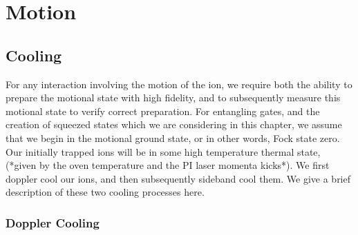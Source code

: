 \section{Motion}
\label{sec:Motion}

\subsection{Cooling}
\label{sec:Cooling}

    For any interaction involving the motion of the ion, we require both the
    ability to prepare the motional state with high fidelity, and to
    subsequently measure this motional state to verify correct preparation. For
    entangling gates, and the creation of squeezed states which we are
    considering in this chapter, we assume that we begin in the motional ground
    state, or in other words, Fock state zero.  Our initially trapped ions will
    be in some high temperature thermal state, (*given by the oven temperature
    and the PI laser momenta kicks*). We first doppler cool our ions, and then
    subsequently sideband cool them. We give a brief description of these two
    cooling processes here.\\

\subsubsection{Doppler Cooling}

